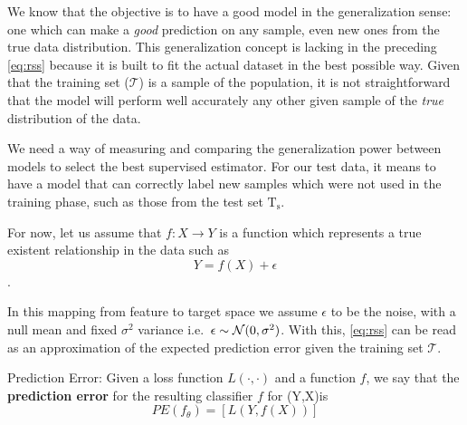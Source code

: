 
We know that the objective is to have a good model in the generalization sense: one which can make a \textit{good} prediction on any sample, even new ones from the true data distribution.
This generalization concept is lacking in the preceding \cref{eq:rss} because it is built to fit the actual dataset in the best possible way.
Given that the training set ($\mathcal{T}$) is a sample of the population, it is not straightforward that the model will perform well accurately any other given sample of the \textit{true} distribution of the data.

We need a way of measuring and comparing the generalization power between models to select the best supervised estimator.
For our test data, it means to have a model that can correctly label new samples which were not used in the training phase, such as those from the test set $\mathrm{T_s}$.


For now, let us assume that $f: X \rightarrow Y$ is a function which represents a true existent relationship in the data such as
$$Y = f(X) + \epsilon$$.

In this mapping from feature to target space we assume $\epsilon$ to be the noise, with a null mean and fixed $\sigma^2$ variance i.e.\ $\epsilon \sim \operatorname{\mathcal{N}}(0,\sigma^2)$.
With this, \cref{eq:rss} can be read as an approximation of the expected prediction error given the training set $\mathcal{T}$.

%


\begin{definition}{Prediction Error:}
	Given a loss function $L(\cdot,\cdot)$ and a function $f$, we say that the \textbf{prediction error} for the resulting classifier $f$ for (Y,X)is
	\[
	PE(f_\theta)= \left[ L(Y,f(X))\right]
	\]
\end{definition}

